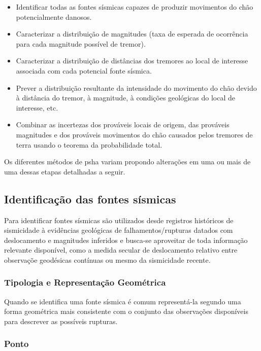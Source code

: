 \begin{itemize}
\item Identificar todas as fontes sísmicas capazes de produzir movimentos do chão potencialmente danosos.
\item Caracterizar a distribuição de magnitudes (taxa de esperada de ocorrência para cada magnitude possível de tremor).
\item Caracterizar a distribuição de distâncias dos tremores ao local de interesse associada com cada potencial fonte
sísmica.
\item Prever a distribuição resultante da intensidade do movimento do chão devido à distância do tremor, à
magnitude, à condições geológicas do local de interesse, etc.
\item Combinar as incertezas dos prováveis locais de origem, das prováveis magnitudes e dos prováveis movimentos
do chão causados pelos tremores de terra usando o teorema da probabilidade total.
\end{itemize}

Os diferentes métodos de \gls{psha} variam propondo alterações em uma ou mais de uma dessas etapas detalhadas a seguir.

\subsection{Identificação das fontes sísmicas}
\label{sec:psha_sources}


Para identificar fontes sísmicas são utilizados desde registros históricos de sismicidade à evidências geológicas de
falhamentos/rupturas datados com deslocamento e magnitudes inferidos e busca-se aproveitar de toda informação relevante
disponível, como a medida secular de deslocamento relativo entre observaçõe geodésicas contínuas ou mesmo da sismicidade recente.


\subsubsection{Tipologia e Representação Geométrica}
\label{sec:fontes_tipologia}

Quando se identifica uma fonte sísmica é comum representá-la segundo uma forma geométrica mais consistente com o
conjunto das observações disponíveis para descrever as possíveis rupturas.

\subsubsection{Ponto}
\label{sec:point_source}

